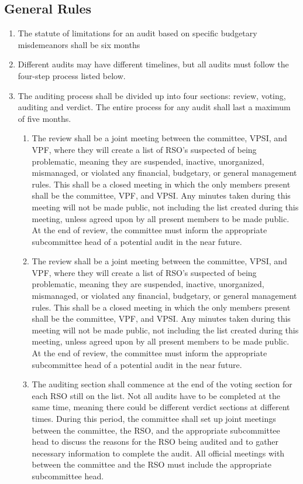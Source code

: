 \documentclass[12pt]{scrreprt}
\begin{document}
\subsection{General Rules}
\begin{enumerate}
    \item The statute of limitations for an audit based on specific budgetary misdemeanors shall be six months
    \item Different audits may have different timelines, but all audits must follow the four-step process listed below.
    \item The auditing process shall be divided up into four sections: review, voting, auditing and verdict. The entire process for any audit shall last a maximum of five months.
    \begin{enumerate}
        \item The review shall be a joint meeting between the committee, VPSI, and VPF, where they will create a list of RSO’s suspected of being problematic, meaning they are suspended, inactive, unorganized, mismanaged, or violated any financial, budgetary, or general management rules. This shall be a closed meeting in which the only members present shall be the committee, VPF, and VPSI. Any minutes taken during this meeting will not be made public, not including the list created during this meeting, unless agreed upon by
all present members to be made public. At the end of review, the
committee must inform the appropriate subcommittee head of a
potential audit in the near future.
    \item The review shall be a joint meeting between the committee, VPSI, and VPF, where they will create a list of RSO’s suspected of being problematic, meaning they are suspended, inactive, unorganized, mismanaged, or violated any financial, budgetary, or general management rules. This shall be a closed meeting in which the only members present shall be the committee, VPF, and VPSI. Any minutes taken during this meeting will not be made public, not including the list created during this meeting, unless agreed upon by all present members to be made public. At the end of review, the committee must inform the appropriate subcommittee head of a potential audit in the near future.
    \item The auditing section shall commence at the end of the voting section for each RSO still on the list. Not all audits have to be completed at the same time, meaning there could be different verdict sections at different times. During this period, the committee shall set up joint meetings between the committee, the RSO, and the appropriate subcommittee head to discuss the reasons for the RSO being audited and to gather necessary information to complete the audit. All official meetings with between the committee and the RSO must include the appropriate subcommittee head.

\end{enumerate}
\end{enumerate}
\end{document}
